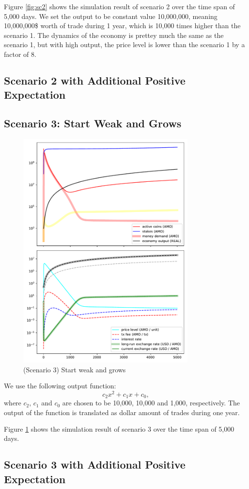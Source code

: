 \documentclass[a4paper,11pt]{scrartcl}
\begin{document}
Figure \ref{fig:sc2} shows the simulation result of scenario 2 over the time
span of 5,000 days. We set the output to be constant value 10,000,000, meaning
10,000,000\$ worth of trade during 1 year, which is 10,000 times higher than
the scenario 1. The dynamics of the economy is prettey much the same as the
scenario 1, but with high output, the price level is lower than the scenario 1
by a factor of 8.

\subsection{Scenario 2 with Additional Positive Expectation}
\label{sc2.1}

\subsection{Scenario 3: Start Weak and Grows}
\label{sc3}

\begin{figure}[hbt!]
	\centering
	\includegraphics[width=0.8\textwidth]{fig/fig3.pdf}
	\caption{(Scenario 3) Start weak and grows}
	\label{fig:sc3}
\end{figure}
We use the following output function:
\begin{equation}
	c_2x^2 + c_1x + c_0,
\end{equation}
where $c_2$, $c_1$ and $c_0$ are chosen to be 10,000, 10,000 and 1,000,
respectively. The output of the function is translated as dollar amount of
trades during one year.

Figure \ref{fig:sc3} shows the simulation result of scenario 3 over the time
span of 5,000 days.

\subsection{Scenario 3 with Additional Positive Expectation}
\label{sc3.1}
\end{document}
